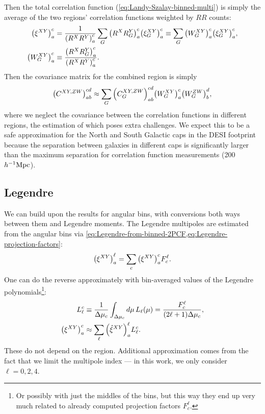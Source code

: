 Then the total correlation function (\cref{eq:Landy-Szalay-binned-multi}) is simply the average of the two regions' correlation functions weighted by $RR$ counts:
\begin{align}
    \qty(\xi^{XY})_a^c &= \frac1{\qty(R^XR^Y)_a^c} \sum_G \qty(R^XR^Y_G)_a^c \qty(\xi^{XY}_G)_a^c \equiv \sum_G \qty(W^{XY}_G)_a^c \qty(\xi^{XY}_G)_a^c, \\
    \qty(W^{XY}_G)_a^c &\equiv \frac{\qty(R^XR^Y_G)_a^c}{\qty(R^XR^Y)_a^c}.
\end{align}
Then the covariance matrix for the combined region is simply
\begin{align}
    \qty(C^{XY,ZW})_{ab}^{cd} \approx \sum_G \qty(C^{XY,ZW}_G)_{ab}^{cd} \qty(W^{XY}_G)_a^c \qty(W^{ZW}_G)_b^d,
\end{align}
where we neglect the covariance between the correlation functions in different regions, the estimation of which poses extra challenges.
We expect this to be a safe approximation for the North and South Galactic caps in the DESI footprint because the separation between galaxies in different caps is significantly larger than the maximum separation for correlation function measurements (200 $h^{-1}{\rm Mpc}$).

\subsection{Legendre}

We can build upon the results for angular bins, with conversions both ways between them and Legendre moments.
The Legendre multipoles are estimated from the angular bins via \cref{eq:Legendre-from-binned-2PCF,eq:Legendre-projection-factors}:
\begin{equation}
    \qty(\xi^{XY})^\ell_a = \sum_c \qty(\xi^{XY})_a^c F^\ell_c.
\end{equation}
One can do the reverse approximately with bin-averaged values of the Legendre polynomials\footnote{Or possibly with just the middles of the bins, but this way they end up very much related to already computed projection factors $F^\ell_c$.}:
\begin{align}
    L_\ell^c &\equiv \frac1{\Delta\mu_c} \int_{\Delta\mu_c} d\mu\, L_\ell(\mu) = \frac{F^\ell_c}{(2\ell + 1) \Delta\mu_c} \label{eq:Legendre-polynomial-means}, \\
    \qty(\xi^{XY})_a^c &\approx \sum_\ell \qty(\hat \xi^{XY})^\ell_a L_\ell^c. \label{eq:binnned-from-Legendre-2PCF}
\end{align}
These do not depend on the region.
Additional approximation comes from the fact that we limit the multipole index --- in this work, we only consider $\ell=0,2,4$.

